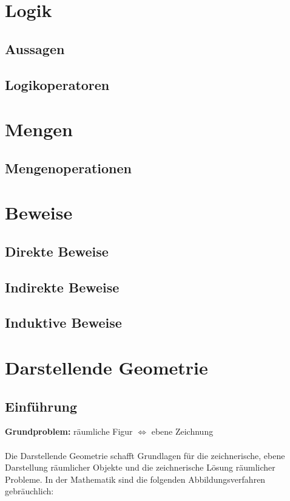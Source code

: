 \documentclass[12pt,a4paper]{scrbook}
\begin{document}
\chapter{Logik}
\section{Aussagen}
\section{Logikoperatoren}

\chapter{Mengen}
\section{Mengenoperationen}

\chapter{Beweise}
\section{Direkte Beweise}

\section{Indirekte Beweise}

\section{Induktive Beweise}

\chapter{Darstellende Geometrie}
\section{Einführung}
\textbf{Grundproblem:} räumliche Figur $\Leftrightarrow$ ebene Zeichnung \\\\
Die Darstellende Geometrie schafft Grundlagen für die zeichnerische, ebene Darstellung räumlicher Objekte
und die zeichnerische Lösung räumlicher Probleme. In der Mathematik sind die
folgenden Abbildungsverfahren gebräuchlich:
\end{document}

